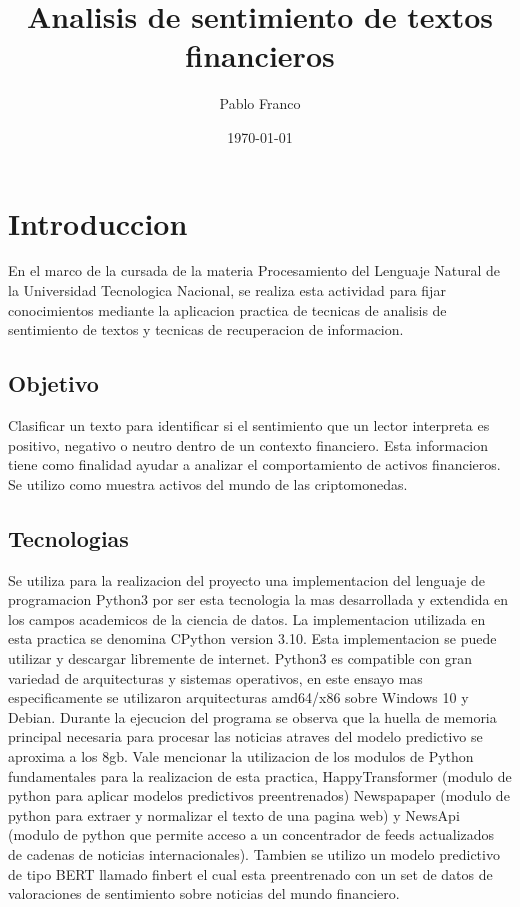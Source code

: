 \documentclass[12pt,jou]{apa7}
\title{Analisis de sentimiento de textos financieros}
\author{Pablo Franco}
\affiliation{Universidad Tecnologica Ncional}
\date{\today}
\begin{document}
\maketitle
\section{Introduccion}\label{sec:introduccion}
En el marco de la cursada de la materia Procesamiento del
Lenguaje Natural de la Universidad Tecnologica Nacional,
se realiza esta actividad para fijar conocimientos
mediante la aplicacion practica de tecnicas de analisis de
sentimiento de textos y tecnicas de recuperacion de informacion.
\subsection{Objetivo}\label{subsec:objetivo}
Clasificar un texto para identificar si el sentimiento
que un lector interpreta es positivo, negativo o neutro
dentro de un contexto financiero.
Esta informacion tiene como finalidad ayudar a
analizar el comportamiento de activos financieros.
Se utilizo como muestra activos del mundo de las
criptomonedas.
\subsection{Tecnologias}\label{subsec:tecnologias}
Se utiliza para la realizacion del proyecto una implementacion
del lenguaje de programacion Python3\cite{cite_01} por ser esta tecnologia
la mas desarrollada y extendida en los campos academicos de la ciencia de datos.
La implementacion utilizada en esta practica se denomina CPython version 3.10.
Esta implementacion se puede utilizar y descargar libremente de internet.
Python3 es compatible con gran variedad de arquitecturas y sistemas operativos,
en este ensayo mas especificamente se utilizaron arquitecturas amd64/x86 sobre Windows 10 y Debian.
Durante la ejecucion del programa se observa que la huella de memoria principal necesaria
para procesar las noticias atraves del modelo predictivo se aproxima a los 8gb.
Vale mencionar la utilizacion de los modulos de Python fundamentales para la
realizacion de esta practica, HappyTransformer\cite{cite_02} (modulo de python para aplicar modelos
predictivos preentrenados)
Newspapaper\cite{cite_03} (modulo de python para extraer y normalizar el texto de una pagina web) y
NewsApi\cite{cite_04} (modulo de python que permite acceso a un concentrador de feeds actualizados
de cadenas de noticias internacionales).
Tambien se utilizo un modelo predictivo de tipo BERT llamado finbert\cite{cite_05}
el cual esta preentrenado con un set de datos de valoraciones de sentimiento
sobre noticias del mundo financiero.
\end{document}
